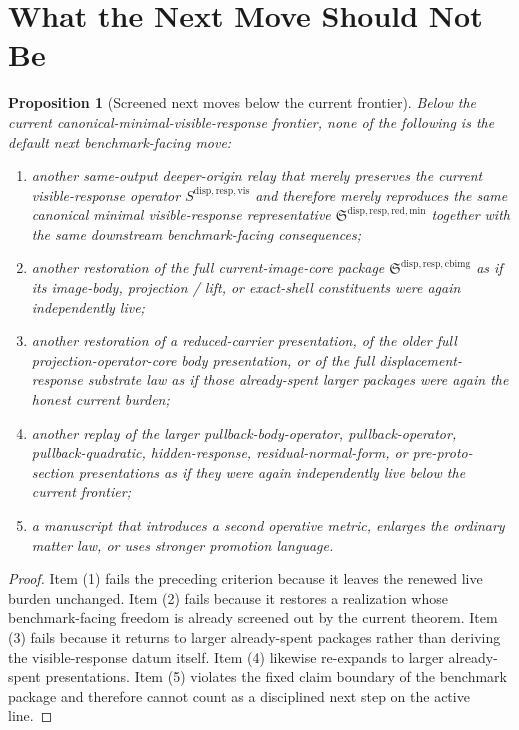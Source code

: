 \documentclass[11pt]{article}
\newcommand{\CurrentBodyImageCore}{\mathfrak S^{\mathrm{disp,resp,cbimg}}}
\newcommand{\VisibleResponseOperator}{S^{\mathrm{disp,resp,vis}}}
\newcommand{\MinimalReducedStructure}{\mathfrak S^{\mathrm{disp,resp,red,min}}}
\newtheorem{proposition}{Proposition}
\begin{document}
\section{What the Next Move Should Not Be}

\begin{proposition}[Screened next moves below the current frontier]
Below the current canonical-minimal-visible-response frontier, none of the following is the default next benchmark-facing move:
\begin{enumerate}
    \item another same-output deeper-origin relay that merely preserves the current visible-response operator \(\VisibleResponseOperator\) and therefore merely reproduces the same canonical minimal visible-response representative \(\MinimalReducedStructure\) together with the same downstream benchmark-facing consequences;
    \item another restoration of the full current-image-core package \(\CurrentBodyImageCore\) as if its image-body, projection / lift, or exact-shell constituents were again independently live;
    \item another restoration of a reduced-carrier presentation, of the older full projection-operator-core body presentation, or of the full displacement-response substrate law as if those already-spent larger packages were again the honest current burden;
    \item another replay of the larger pullback-body-operator, pullback-operator, pullback-quadratic, hidden-response, residual-normal-form, or pre-proto-section presentations as if they were again independently live below the current frontier;
    \item a manuscript that introduces a second operative metric, enlarges the ordinary matter law, or uses stronger promotion language.
\end{enumerate}
\end{proposition}

\begin{proof}
Item (1) fails the preceding criterion because it leaves the renewed live burden unchanged. Item (2) fails because it restores a realization whose benchmark-facing freedom is already screened out by the current theorem. Item (3) fails because it returns to larger already-spent packages rather than deriving the visible-response datum itself. Item (4) likewise re-expands to larger already-spent presentations. Item (5) violates the fixed claim boundary of the benchmark package and therefore cannot count as a disciplined next step on the active line.
\end{proof}
\end{document}

